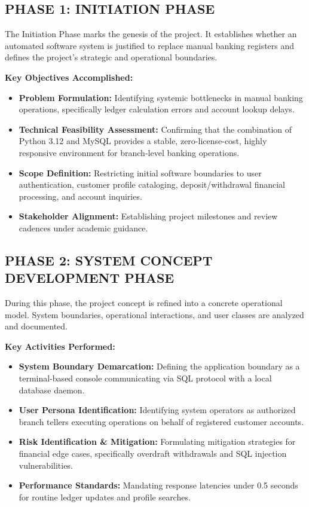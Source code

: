 \documentclass[12pt,a4paper]{article}
\begin{document}
\subsection*{PHASE 1: INITIATION PHASE}
The Initiation Phase marks the genesis of the project. It establishes whether an automated software system is justified to replace manual banking registers and defines the project's strategic and operational boundaries.

\vspace{0.4em}
\noindent\textbf{Key Objectives Accomplished:}
\begin{itemize}
    \item \textbf{Problem Formulation:} Identifying systemic bottlenecks in manual banking operations, specifically ledger calculation errors and account lookup delays.
    \item \textbf{Technical Feasibility Assessment:} Confirming that the combination of Python 3.12 and MySQL provides a stable, zero-license-cost, highly responsive environment for branch-level banking operations.
    \item \textbf{Scope Definition:} Restricting initial software boundaries to user authentication, customer profile cataloging, deposit/withdrawal financial processing, and account inquiries.
    \item \textbf{Stakeholder Alignment:} Establishing project milestones and review cadences under academic guidance.
\end{itemize}

\vspace{1.2em}
\subsection*{PHASE 2: SYSTEM CONCEPT DEVELOPMENT PHASE}
During this phase, the project concept is refined into a concrete operational model. System boundaries, operational interactions, and user classes are analyzed and documented.

\vspace{0.4em}
\noindent\textbf{Key Activities Performed:}
\begin{itemize}
    \item \textbf{System Boundary Demarcation:} Defining the application boundary as a terminal-based console communicating via SQL protocol with a local database daemon.
    \item \textbf{User Persona Identification:} Identifying system operators as authorized branch tellers executing operations on behalf of registered customer accounts.
    \item \textbf{Risk Identification \& Mitigation:} Formulating mitigation strategies for financial edge cases, specifically overdraft withdrawals and SQL injection vulnerabilities.
    \item \textbf{Performance Standards:} Mandating response latencies under 0.5 seconds for routine ledger updates and profile searches.
\end{itemize}
\end{document}
